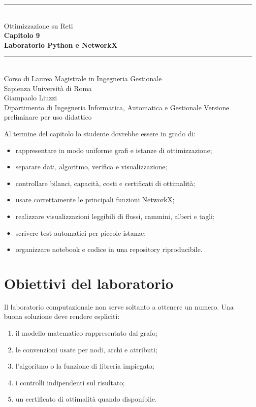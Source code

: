 \documentclass[11pt,a4paper]{article}
\begin{document}
\hypersetup{pageanchor=false}
\begin{titlepage}\centering\vspace*{1.6cm}
{\color{sapienzared}\rule{\textwidth}{1.2pt}}\\[1.1cm]{\Large Ottimizzazione su Reti}\\[0.35cm]
{\huge\bfseries Capitolo 9}\\[0.45cm]{\LARGE\bfseries Laboratorio Python e NetworkX}\\[1.1cm]
{\color{sapienzared}\rule{0.72\textwidth}{0.8pt}}\\[1.1cm]
{\large Corso di Laurea Magistrale in Ingegneria Gestionale}\\[0.25cm]{\large Sapienza Università di Roma}\\[1.2cm]
{\large Giampaolo Liuzzi}\\[0.25cm]{\normalsize Dipartimento di Ingegneria Informatica, Automatica e Gestionale}
\vfill{\small Versione preliminare per uso didattico}\end{titlepage}
\hypersetup{pageanchor=true}\tableofcontents\newpage{}

\begin{learningbox}
Al termine del capitolo lo studente dovrebbe essere in grado di:
\begin{itemize}[nosep]
\item rappresentare in modo uniforme grafi e istanze di ottimizzazione;
\item separare dati, algoritmo, verifica e visualizzazione;
\item controllare bilanci, capacità, costi e certificati di ottimalità;
\item usare correttamente le principali funzioni NetworkX;
\item realizzare visualizzazioni leggibili di flussi, cammini, alberi e tagli;
\item scrivere test automatici per piccole istanze;
\item organizzare notebook e codice in una repository riproducibile.
\end{itemize}
\end{learningbox}

\section{Obiettivi del laboratorio}
Il laboratorio computazionale non serve soltanto a ottenere un numero. Una buona soluzione deve rendere espliciti:
\begin{enumerate}
\item il modello matematico rappresentato dal grafo;
\item le convenzioni usate per nodi, archi e attributi;
\item l'algoritmo o la funzione di libreria impiegata;
\item i controlli indipendenti sul risultato;
\item un certificato di ottimalità quando disponibile.
\end{enumerate}
\end{document}
